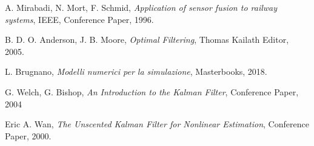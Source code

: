 \begin{thebibliography}{9}

A. Mirabadi, N. Mort, F. Schmid, \textit{Application of sensor fusion to railway systems}, IEEE, Conference Paper, 1996.


 B. D. O. Anderson, J. B. Moore, \textit{Optimal Filtering}, Thomas Kailath Editor, 2005.

L. Brugnano, \textit{Modelli numerici per la simulazione}, Masterbooks, 2018.


 G. Welch, G. Bishop, \textit{An Introduction to the Kalman Filter}, Conference Paper, 2004

  Eric A. Wan,
  \textit{The Unscented Kalman Filter for Nonlinear Estimation}, Conference Paper, 2000.

\end{thebibliography}